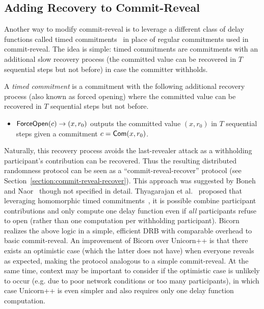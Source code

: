\subsection{Adding Recovery to Commit-Reveal}
Another way to modify commit-reveal is to leverage a different class of delay functions called timed commitments~\cite{boneh2000timed} in place of regular commitments used in commit-reveal.
The idea is simple: timed commitments are commitments with an additional slow recovery process (the committed value can be recovered in $T$ sequential steps but not before) in case the committer withholds.

\begin{definition}
A \textit{timed commitment} is a commitment with the following additional recovery process (also known as forced opening) where the committed value can be recovered in $T$ sequential steps but not before.
\begin{itemize}
\item $\mathsf{ForceOpen}(c) \rightarrow (x, r_0)$ outputs the committed value $(x, r_0)$ in $T$ sequential steps given a commitment $c = \mathsf{Com}(x, r_0)$.
\end{itemize}
\end{definition}

Naturally, this recovery process avoids the last-revealer attack as a withholding participant's contribution can be recovered. Thus the resulting distributed randomness protocol can be seen as a ``commit-reveal-recover'' protocol (see Section~\ref{section:commit-reveal-recover}).
This approach was suggested by Boneh and Naor~\cite{boneh2000timed} though not specified in detail.
Thyagarajan et al.~\cite{thyagarajan2021efficient} proposed that leveraging homomorphic timed commitments~\cite{thyagarajan2021efficient}, it is possible combine participant contributions and only compute one delay function even if \emph{all} participants refuse to open (rather than one computation per withholding participant).
Bicorn~\cite{choi2022bicorn} realizes the above logic in a simple, efficient DRB with comparable overhead to basic commit-reveal.
An improvement of Bicorn over Unicorn++ is that there exists an optimistic case (which the latter does not have) when everyone reveals as expected, making the protocol analogous to a simple commit-reveal.
At the same time, context may be important to consider if the optimistic case is unlikely to occur (e.g. due to poor network conditions or too many participants), in which case Unicorn++ is even simpler and also requires only one delay function computation.

